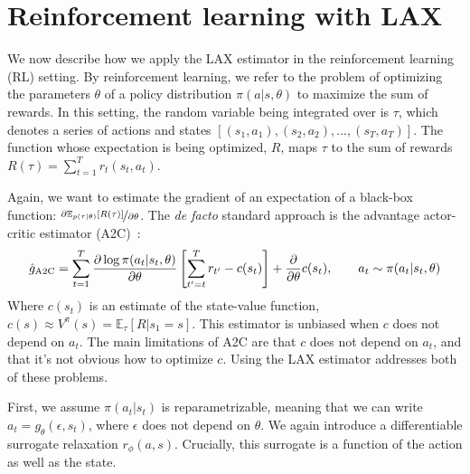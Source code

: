 \documentclass{article}
\newcommand{\E}{\mathbb{E}}
\newcommand{\LL}[1]{\frac{\partial \log \pi(a_{#1}| s_{#1}, \theta)}{\partial \theta}}
\newcommand{\LAX}{{\textnormal{LAX}}}
\begin{document}
\section{Reinforcement learning with \LAX{}}
We now describe how we apply the \LAX{} estimator in the reinforcement learning (RL) setting.
By reinforcement learning, we refer to the problem of optimizing the parameters $\theta$ of a policy distribution $\pi(a | s, \theta)$ to maximize the sum of rewards.
In this setting, the random variable being integrated over is $\tau$, which denotes a series of actions and states $[(s_1, a_1), (s_2, a_2), ..., (s_T, a_T)]$.
The function whose expectation is being optimized, $R$, maps $\tau$ to the sum of rewards ${R(\tau) = \sum_{t=1}^{T} r_t(s_t, a_t)}$.

Again, we want to estimate the gradient of an expectation of a black-box function: $\nicefrac{\partial \mathbb{E}_{p(\tau|\theta)}[R(\tau)]}{\partial \theta}$.
The \emph{de facto} standard approach is the advantage actor-critic estimator (A2C)~\citep{sutton2000policy}:%
%
%
%
%
%
%
\begin{align}
\hat g_{\textnormal{A2C}} = \sum_{t=1}^T \LL{t} \left[ \sum_{t'=t}^T r_{t'} - c(s_t) \right]+\frac{\partial}{\partial\theta} c(s_t), \qquad a_t \sim \pi(a_t | s_t, \theta)
\label{eq:rl_a2c}
\end{align}
%
Where $c(s_t)$ is an estimate of the state-value function, $c(s) \approx V^\pi(s) = \E_{\tau}[R|s_1=s].$
This estimator is unbiased when $c$ does not depend on $a_t$.
The main limitations of A2C are that $c$ does not depend on $a_t$, and that it's not obvious how to optimize $c$.
Using the \LAX{} estimator addresses both of these problems.

First, we assume $\pi(a_t|s_t)$ is reparametrizable, meaning that we can write $a_t = g_\theta(\epsilon,s_t)$, where $\epsilon$ does not depend on $\theta$.
We again introduce a differentiable surrogate relaxation $r_\phi(a,s)$.
Crucially, this surrogate is a function of the action as well as the state.
\end{document}

